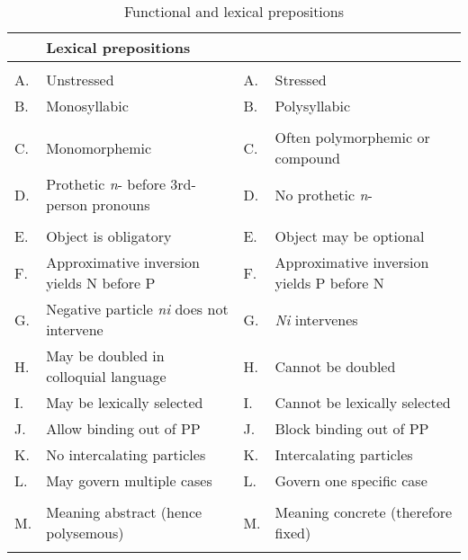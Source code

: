 \documentclass[output=paper,
]{langscibook}
\begin{document}
\begin{table}[h]
  \centering
  \caption{Functional and lexical prepositions \citep[70]{YadroffFranks2001}}
    \begin{tabularx}{\textwidth}{p{1em}p{13em}p{1em}p{13em}}\lsptoprule
    \multicolumn{2}{p{15em}}{Functional prepositions } & \multicolumn{2}{p{15em}}{Lexical prepositions} \\\midrule\addlinespace
    \multicolumn{2}{p{14em}}{\textit{Phonology}} & \multicolumn{1}{r}{} & \multicolumn{1}{r}{} \\
    A.    & Unstressed  & A.    & Stressed \\
    B.    & Monosyllabic & B.    & Polysyllabic \\\addlinespace
    \multicolumn{2}{p{14em}}{\textit{Morphology}} & \multicolumn{1}{r}{} & \multicolumn{1}{r}{} \\
    C.    & Monomorphemic & C.    & Often polymorphemic or compound \\
    D.    & Prothetic \textit{n}- before 3rd-person pronouns & D.    & No prothetic \textit{n}- \\\addlinespace
    \multicolumn{2}{p{14em}}{\textit{Syntax}} & \multicolumn{1}{r}{} & \multicolumn{1}{r}{} \\
    E.    & Object is obligatory & E.    & Object may be optional \\
    F.    & Approximative inversion yields N before P  & F.    & Approximative inversion yields P before N \\
    G.    & Negative particle \textit{ni} does not intervene & G.    & \textit{Ni} intervenes \\
    H.    & May be doubled in colloquial language & H.    & Cannot be doubled \\
    I.    & May be lexically selected & I.    & Cannot be lexically selected \\
    J.    & Allow binding out of PP & J.    & Block binding out of PP \\
    K.    & No intercalating particles & K.    & Intercalating particles \\
    L.    & May govern multiple cases & L.    & Govern one specific case \\\addlinespace
    \multicolumn{2}{p{14em}}{\textit{Semantics}} & \multicolumn{1}{r}{} & \multicolumn{1}{r}{} \\
    M.    & Meaning abstract (hence polysemous) & M.    & Meaning concrete (therefore fixed) \\\lspbottomrule
    \end{tabularx}
  \label{FCP}
\end{table}
\end{document}
